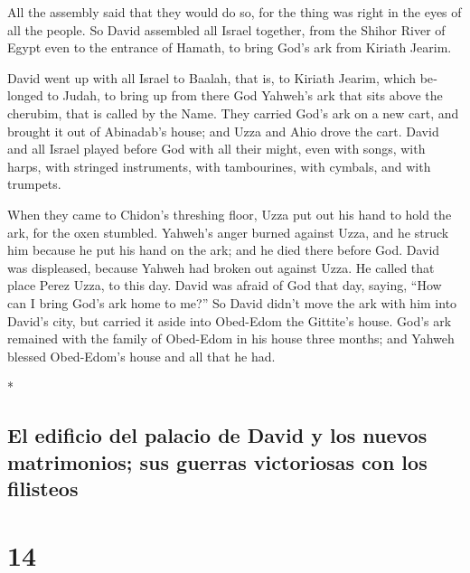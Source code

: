 \begin{paracol}{2}
\begin{otherlanguage}{english}
 All the assembly said that they would do so, for the
thing was right in the eyes of all the people.  So David
assembled all Israel together, from the Shihor River of Egypt even to
the entrance of Hamath, to bring God's ark from Kiriath Jearim.

 David went up with all Israel to Baalah, that is, to
Kiriath Jearim, which belonged to Judah, to bring up from there God
Yahweh's ark that sits above the cherubim, that is called by the Name.
 They carried God's ark on a new cart, and brought it out
of Abinadab's house; and Uzza and Ahio drove the cart. 
David and all Israel played before God with all their might, even with
songs, with harps, with stringed instruments, with tambourines, with
cymbals, and with trumpets.

 When they came to Chidon's threshing floor, Uzza put out
his hand to hold the ark, for the oxen stumbled. 
Yahweh's anger burned against Uzza, and he struck him because he put his
hand on the ark; and he died there before God.  David was
displeased, because Yahweh had broken out against Uzza. He called that
place Perez Uzza, to this day.  David was afraid of God
that day, saying, ``How can I bring God's ark home to me?''
 So David didn't move the ark with him into David's city,
but carried it aside into Obed-Edom the Gittite's house. 
God's ark remained with the family of Obed-Edom in his house three
months; and Yahweh blessed Obed-Edom's house and all that he had.

\end{otherlanguage}

\switchcolumn[0]*

\hypertarget{el-edificio-del-palacio-de-david-y-los-nuevos-matrimonios-sus-guerras-victoriosas-con-los-filisteos}{%
\subsection{El edificio del palacio de David y los nuevos matrimonios;
sus guerras victoriosas con los
filisteos}\label{el-edificio-del-palacio-de-david-y-los-nuevos-matrimonios-sus-guerras-victoriosas-con-los-filisteos}}

\hypertarget{section-26}{%
\section{14}\label{section-26}}


\end{paracol}
